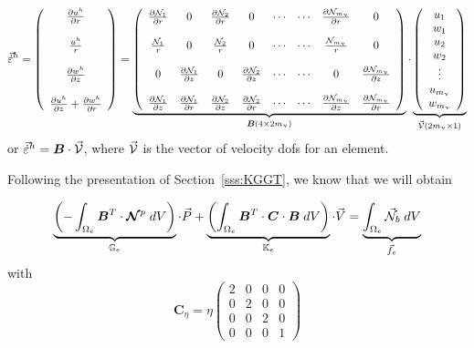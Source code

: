 \begin{equation}
\vec{\dot\varepsilon}^h=
\left(
\begin{array}{c}
\frac{\partial u^h}{\partial r} \\ \\
\frac{u^h}{r} \\ \\
\frac{\partial w^h}{\partial z} \\ \\
\frac{\partial u^h}{\partial z} + \frac{\partial w^h}{\partial r} 
\end{array}
\right)
=
\underbrace{
\left(
\begin{array}{ccccccccc}
\frac{\partial {\mathcal{N}}_1}{\partial r} &  0 &  
\frac{\partial {\mathcal{N}}_2}{\partial r} &  0 & 
\cdots & \cdots &
\frac{\partial {\mathcal{N}}_{m_\upnu}}{\partial r} &  0 
\\  \\
\frac{{\mathcal{N}}_1}{r}  & 0 &  
\frac{{\mathcal{N}}_2}{r}  & 0 & 
\cdots & \cdots &
\frac{{\mathcal{N}}_{m_\upnu}}{r}  & 0  
\\  \\
0 & \frac{\partial {\mathcal{N}}_1}{\partial z}  &
0 & \frac{\partial {\mathcal{N}}_2}{\partial z}  &  
\cdots & \cdots &
0 & \frac{\partial {\mathcal{N}}_{m_\upnu}}{\partial z}   
\\ \\
\frac{\partial {\mathcal{N}}_1}{\partial z} & \frac{\partial {\mathcal{N}}_1}{\partial r}  &
\frac{\partial {\mathcal{N}}_2}{\partial z} & \frac{\partial {\mathcal{N}}_2}{\partial r}  & \cdots & \cdots &
\frac{\partial {\mathcal{N}}_{m_\upnu}}{\partial z} & \frac{\partial {\mathcal{N}}_{m_\upnu}}{\partial r}  
\end{array}
\right)
}_{\bm B (4\times 2 m_\upnu) }
\cdot
\underbrace{
\left(
\begin{array}{c}
u_1 \\  w_1 \\ u_2 \\  w_2  \\ \vdots \\ u_{m_\upnu} \\ w_{m_\upnu} 
\end{array}
\right)
}_{\vec{\cal V} ( 2m_\upnu \times1)}
\end{equation}
or $\vec{\dot{\varepsilon}}^h= {\bm B} \cdot \vec{\cal V}$, where $\vec{\cal V}$ is the vector 
of velocity dofs for an element.

Following the presentation of Section~\ref{sss:KGGT}, 
we know that we will obtain 


\begin{equation}
\underbrace{\left(-\int_{\Omega_e} {\bm B}^T \cdot 
{\bm {{\mathcal{N}}}}^p  
\; dV \right)}_{{\mathbb{G}}_e} \cdot {\vec P} 
+
\underbrace{
\left(
\int_{\Omega_e} {\bm B}^T \cdot 
{\bm C} \cdot  {\bm B}
\; dV
\right)}_{{\mathbb{K}}_e}
\cdot {\vec V}
=
\underbrace{\int_{\Omega_e} {\vec {{\mathcal{N}}}}_b \; dV }_{{\vec f}_e}
\end{equation}
with 
\[
{\bm C}_\eta= \eta
\left(
\begin{array}{cccc}
2 & 0 & 0 & 0  \\
0& 2 & 0& 0  \\
0 & 0 & 2 & 0  \\
0 & 0 & 0 & 1
\end{array}
\right)
\]

